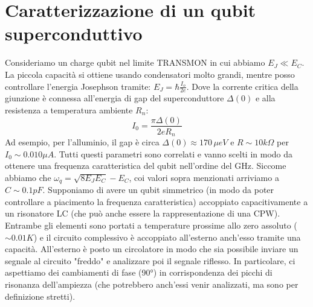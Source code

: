 \vspace{0.5cm}
\newline
\noindent{}
\section{Caratterizzazione di un qubit superconduttivo}
Consideriamo un charge qubit nel limite TRANSMON in cui abbiamo $E_J\ll E_C$.  La piccola capacità si ottiene usando condensatori molto grandi, mentre posso controllare l'energia Josephson tramite: $E_J=\hbar\frac{I_o}{2e}$. Dove la corrente critica della giunzione è connessa all'energia di gap del superconduttore $\Delta(0)$ e alla resistenza a temperatura ambiente $R_n$:
\begin{equation*}
    I_0 = \frac{\pi \Delta(0)}{2eR_n}
\end{equation*}
Ad esempio, per l'alluminio, il gap è circa $\Delta(0) \approx 170 \,\mu eV$ e $R\sim10k\Omega$ per $I_0\sim0.010\mu A$.
Tutti questi parametri sono correlati e vanno scelti in modo da ottenere una frequenza caratteristica del qubit nell'ordine del GHz. Siccome abbiamo che $\omega_q=\sqrt{8E_JE_C}-E_C$, coi valori sopra menzionati arriviamo a $C\sim0.1pF$.
Supponiamo di avere un qubit simmetrico (in modo da poter controllare a piacimento la frequenza caratteristica) accoppiato capacitivamente a un risonatore LC (che può anche essere la rappresentazione di una CPW). Entrambe gli elementi sono portati a temperature prossime allo zero assoluto ($\sim 0.01K$) e il circuito complessivo è accoppiato all'esterno anch'esso tramite una capacità.
All'esterno è posto un circolatore in modo che sia possibile inviare un segnale al circuito "freddo" e analizzare poi il segnale riflesso. In particolare, ci aspettiamo dei cambiamenti di fase (90°) in corrispondenza dei picchi di risonanza dell'ampiezza (che potrebbero anch'essi venir analizzati, ma sono per definizione stretti).

